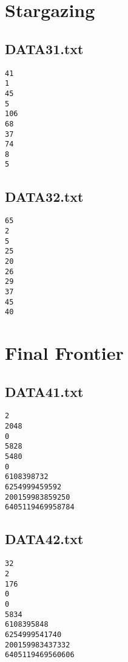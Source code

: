 \documentclass{article}
\begin{document}
\pagebreak


\section{Stargazing}

\subsection{DATA31.txt}

\begin{verbatim}
41
1
45
5
106
68
37
74
8
5
\end{verbatim}

\subsection{DATA32.txt}

\begin{verbatim}
65
2
5
25
20
26
29
37
45
40
\end{verbatim}


\pagebreak


\section{Final Frontier}

\subsection{DATA41.txt}

\begin{verbatim}
2
2048
0
5828
5480
0
6108398732
6254999459592
200159983859250
6405119469958784
\end{verbatim}

\subsection{DATA42.txt}

\begin{verbatim}
32
2
176
0
0
5834
6108395848
6254999541740
200159983437332
6405119469560606
\end{verbatim}
\end{document}
